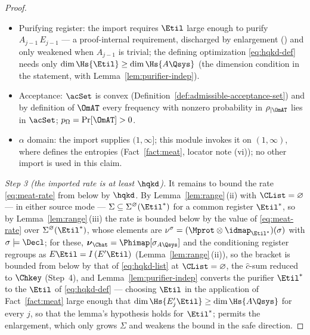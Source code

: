 \begin{proof}
\begin{itemize}[leftmargin=1.6em]
assumed identical across rounds. No $\Sigma=\Sigma_1$ collapse is
available or used --- the round channels $\Mprot_j$ are genuinely
non-isomorphic (the registers $E_{j-1}$ differ across $j$) --- and the
homogeneity of the declaration enters only through the common target
set of Lemma~\ref{lem:range}\,(ii). It is
$\Mprot$, not the trustedness of $\tau_A$, that supplies the sharing:
in untrusted-source mode the target sets
$\Sigma_j\subseteq\Sigma^{\CList}(\Etil^{*})$ are contained in a common
set for the same reason, with the marginal clause of
\eqref{eq:margcond} empty.
\item Purifying register: the import requires $\Etil$ large enough to
purify $A_{j-1}\,E_{j-1}$ --- a proof-internal requirement, discharged
by enlargement (\cite[footnote~17]{arqand2025meat}) and only weakened
when $A_{j-1}$ is trivial; the defining
optimization \eqref{eq:hqkd-def} needs only
$\dim\Hs{\Etil}\ge\dim\Hs{A\Qsys}$
(the dimension condition in the statement, with
Lemma~\ref{lem:purifier-indep}).
\item Acceptance: $\acSet$ is convex (Definition~\ref{def:admissible-acceptance-set}) and by
definition of $\OmAT$ every frequency with nonzero probability in
$\rho_{|\OmAT}$ lies in $\acSet$; $p_{\Omega}=\Pr[\OmAT]>0$.
\item $\alpha$ domain: the import supplies $(1,\infty]$; this
module invokes it on $(1,\infty)$, where
 defines the entropies
(Fact~\ref{fact:meat}, locator note (vi)); no other import is used in
this claim.
\end{itemize}

\emph{Step 3 (the imported rate is at least $\hqkd$).} It remains to bound
the rate \eqref{eq:meat-rate} from below by $\hqkd$. By
Lemma~\ref{lem:range}\,(ii) with $\CList=\varnothing$ --- in either source
mode ---
$\Sigma\subseteq\Sigma^{\varnothing}(\Etil^{*})$ for a common register
$\Etil^{*}$, so by Lemma~\ref{lem:range}\,(iii) the rate is bounded
below by the value of \eqref{eq:meat-rate} over
$\Sigma^{\varnothing}(\Etil^{*})$, whose elements are
$\nu^{\sigma}=(\Mprot\otimes\idmap_{\Etil^{*}})(\sigma)$ with
$\sigma\models\Decl$; for these,
$\boldsymbol{\nu}_{\Chat}=\Phimap[\sigma_{A\Qsys}]$ and the
conditioning register regroups as $E\Etil=I\,(E'\Etil)$
(Lemma~\ref{lem:range}\,(ii)), so the bracket is bounded from below by
that of \eqref{eq:hqkd-list} at $\CList=\varnothing$, the $\hat c$-sum
reduced to $\Chkey$ (Step~4), and Lemma~\ref{lem:purifier-indep} converts the purifier
$\Etil^{*}$ to the $\Etil$ of \eqref{eq:hqkd-def} --- choosing $\Etil$ in the
application of Fact~\ref{fact:meat} large enough that
$\dim\Hs{E'_j\Etil}\ge\dim\Hs{A\Qsys}$ for every $j$, so that the
lemma's hypothesis holds for $\Etil^{*}$;
\cite[footnote~17]{arqand2025meat} permits the enlargement, which
only grows $\Sigma$ and weakens the bound in the safe direction.


\end{proof}
